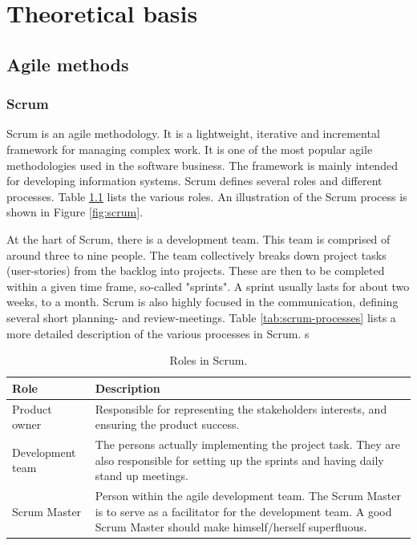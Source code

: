 \chapter{Theoretical basis}

\section{Agile methods}
\subsection{Scrum}
Scrum \cite{scrum} is an agile methodology. It is a lightweight, iterative and incremental framework for managing complex work. It is one of the most popular agile methodologies used in the software business. The framework is mainly intended for developing information systems. Scrum defines several roles and different processes. Table \ref{tab:scrum-roles} lists the various roles. An illustration of the Scrum process is shown in Figure \ref{fig:scrum}.

At the hart of Scrum, there is a development team. This team is comprised of around three to nine people. The team collectively breaks down project tasks (user-stories) from the backlog into projects. These are then to be completed within a given time frame, so-called "sprints". A sprint usually lasts for about two weeks, to a month. Scrum is also highly focused in the communication, defining several short planning- and review-meetings. Table \ref{tab:scrum-processes} lists a more detailed description of the various processes in Scrum. 
s
\begin{table}[H]
    \centering
    \caption{Roles in Scrum.}
    \label{tab:scrum-roles}
    \begin{tabularx}{\textwidth}{|l|X|}
        \hline
        \textbf{Role} & \textbf{Description}\\
        \hline
        Product owner & Responsible for representing the stakeholders interests, and ensuring the product success.\\
        \hline
        Development team & The persons actually implementing the project task. They are also responsible for setting up the sprints and having daily stand up meetings.\\
        \hline
        Scrum Master & Person within the agile development team. The Scrum Master is to serve as a facilitator for the development team. A good Scrum Master should make himself/herself superfluous.\\
        \hline
    \end{tabularx}
\end{table}


